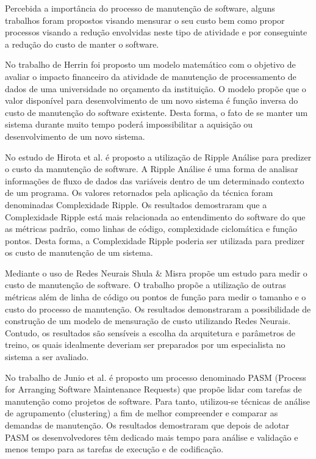 \documentclass[msc,proposal,hidelot,hideabstract]{ppgccufmg} %
\begin{document}
Percebida a importância do processo de manutenção de software, alguns trabalhos foram propostos visando mensurar o seu custo bem como propor
processos visando a redução envolvidas neste tipo de atividade e por conseguinte a redução do custo de manter o software.

No trabalho de Herrin \cite{Herrin:1985:SMC:323287.323383} foi proposto um modelo matemático com o
objetivo de avaliar o impacto financeiro da atividade de manutenção de
processamento de dados de uma universidade no orçamento da instituição. O
modelo propõe que o valor disponível para desenvolvimento de um novo sistema é
função inversa do custo de manutenção do software existente. Desta forma, o
fato de se manter um sistema durante muito tempo poderá impossibilitar a
aquisição ou desenvolvimento de um novo sistema.

No estudo de Hirota et al. \cite{hirota1994approach} é proposto a utilização de
Ripple Análise para predizer o custo da manutenção de software. A Ripple
Análise é uma forma de analisar informações de fluxo de dados das variáveis
dentro de um determinado contexto de um programa. Os valores retornados pela
aplicação da técnica foram denominadas Complexidade Ripple. Os resultados
demostraram que a Complexidade Ripple está mais relacionada ao entendimento do
software do que as métricas padrão, como linhas de código, complexidade
ciclomática e função pontos. Desta forma, a Complexidade Ripple poderia ser
utilizada para predizer os custo de manutenção de um sistema.

Mediante o uso de Redes Neurais Shula \& Misra
\cite{Shukla:2008:ESM:1342211.1342232} propõe um estudo para medir o custo de
manutenção de software. O trabalho propõe a utilização de outras métricas além
de linha de código ou pontos de função para medir o tamanho e o custo do
processo de manutenção. Os resultados demonstraram a possibilidade de
construção de um modelo de mensuração de custo utilizando Redes
Neurais. Contudo, os resultados são sensíveis a escolha da arquitetura e
parâmetros de treino, os quais idealmente deveriam ser preparados por um
especialista no sistema a ser avaliado.

No trabalho de Junio et al. \cite{5741246} é proposto um processo denominado PASM (Process for Arranging
Software Maintenance Requests) que propõe lidar com tarefas de manutenção como
projetos de software. Para tanto, utilizou-se técnicas de análise de
agrupamento (clustering) a fim de melhor compreender e comparar as demandas de
manutenção. Os resultados demostraram que depois de adotar PASM os
desenvolvedores têm dedicado mais tempo para análise e validação e menos tempo
para as tarefas de execução e de codificação.
\end{document}
